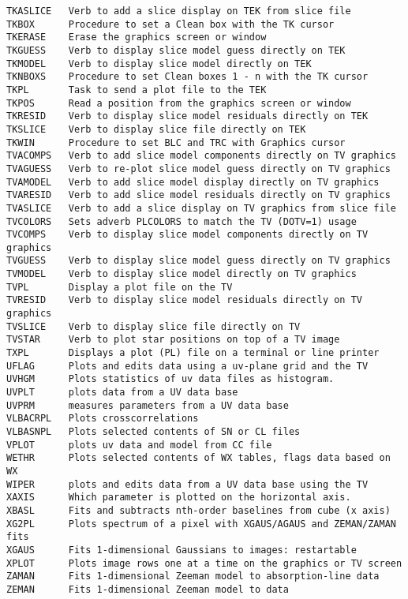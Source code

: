 \begin{verbatim}
TKASLICE   Verb to add a slice display on TEK from slice file
TKBOX      Procedure to set a Clean box with the TK cursor
TKERASE    Erase the graphics screen or window
TKGUESS    Verb to display slice model guess directly on TEK
TKMODEL    Verb to display slice model directly on TEK
TKNBOXS    Procedure to set Clean boxes 1 - n with the TK cursor
TKPL       Task to send a plot file to the TEK
TKPOS      Read a position from the graphics screen or window
TKRESID    Verb to display slice model residuals directly on TEK
TKSLICE    Verb to display slice file directly on TEK
TKWIN      Procedure to set BLC and TRC with Graphics cursor
TVACOMPS   Verb to add slice model components directly on TV graphics
TVAGUESS   Verb to re-plot slice model guess directly on TV graphics
TVAMODEL   Verb to add slice model display directly on TV graphics
TVARESID   Verb to add slice model residuals directly on TV graphics
TVASLICE   Verb to add a slice display on TV graphics from slice file
TVCOLORS   Sets adverb PLCOLORS to match the TV (DOTV=1) usage
TVCOMPS    Verb to display slice model components directly on TV graphics
TVGUESS    Verb to display slice model guess directly on TV graphics
TVMODEL    Verb to display slice model directly on TV graphics
TVPL       Display a plot file on the TV
TVRESID    Verb to display slice model residuals directly on TV graphics
TVSLICE    Verb to display slice file directly on TV
TVSTAR     Verb to plot star positions on top of a TV image
TXPL       Displays a plot (PL) file on a terminal or line printer
UFLAG      Plots and edits data using a uv-plane grid and the TV
UVHGM      Plots statistics of uv data files as histogram.
UVPLT      plots data from a UV data base
UVPRM      measures parameters from a UV data base
VLBACRPL   Plots crosscorrelations
VLBASNPL   Plots selected contents of SN or CL files
VPLOT      plots uv data and model from CC file
WETHR      Plots selected contents of WX tables, flags data based on WX
WIPER      plots and edits data from a UV data base using the TV
XAXIS      Which parameter is plotted on the horizontal axis.
XBASL      Fits and subtracts nth-order baselines from cube (x axis)
XG2PL      Plots spectrum of a pixel with XGAUS/AGAUS and ZEMAN/ZAMAN fits
XGAUS      Fits 1-dimensional Gaussians to images: restartable
XPLOT      Plots image rows one at a time on the graphics or TV screen
ZAMAN      Fits 1-dimensional Zeeman model to absorption-line data
ZEMAN      Fits 1-dimensional Zeeman model to data
\end{verbatim}\eve

\vfill\eject
{}

